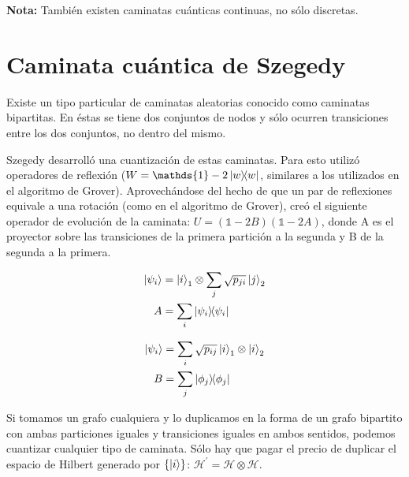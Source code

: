 \textbf{Nota:} También existen caminatas cuánticas continuas, no sólo discretas.

\section{Caminata cuántica de Szegedy}

Existe un tipo particular de caminatas aleatorias conocido como caminatas bipartitas. En éstas se tiene dos conjuntos de nodos y sólo ocurren transiciones entre los dos conjuntos, no dentro del mismo.


Szegedy desarrolló una cuantización de estas caminatas. Para esto utilizó operadores de reflexión ($W = \mathds{1} - 2 \ketbra{w}{w}$, similares a los utilizados en el algoritmo de Grover). Aprovechándose del hecho de que un par de reflexiones equivale a una rotación (como en el algoritmo de Grover), creó el siguiente operador de evolución de la caminata: $U = (\mathds{1} - 2 B)(\mathds{1} - 2 A)$, donde A es el proyector sobre las transiciones de la primera partición a la segunda y B de la segunda a la primera.

\begin{minipage}{0.5\linewidth}
\begin{align*}
\ket{\psi_i} &= \ket{i}_1 \otimes \sum\limits_j \sqrt{p_{j i}} \ket{j}_2 \\
A &= \sum\limits_i \ketbra{\psi_i}{\psi_i}
\end{align*}
\end{minipage}
\begin{minipage}{0.5\linewidth}
\begin{align*}
\ket{\psi_i} &= \sum\limits_i \sqrt{p_{i j}} \ket{i}_1 \otimes \ket{i}_2 \\
B &= \sum\limits_j \ketbra{\phi_j}{\phi_j}
\end{align*}
\end{minipage}

Si tomamos un grafo cualquiera y lo duplicamos en la forma de un grafo bipartito con ambas particiones iguales y transiciones iguales en ambos sentidos, podemos cuantizar cualquier tipo de caminata. Sólo hay que pagar el precio de duplicar el espacio de Hilbert generado por $\{\ket{i}\}$: $\mathcal{H}^\prime = \mathcal{H} \otimes \mathcal{H}$.

